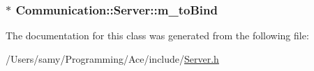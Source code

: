 \subsubsection[{m\+\_\+to\+Bind}]{$\ast$ Communication\+::\+Server\+::m\+\_\+to\+Bind\hspace{0.3cm}{\ttfamily [private]}}\label{class_communication_1_1_server_a9e61ac5bb8ac2471084a4f2ea90347d8}


The documentation for this class was generated from the following file\+:\begin{DoxyCompactItemize}
\item 
/\+Users/samy/\+Programming/\+Ace/include/\hyperlink{_server_8h}{Server.\+h}\end{DoxyCompactItemize}
